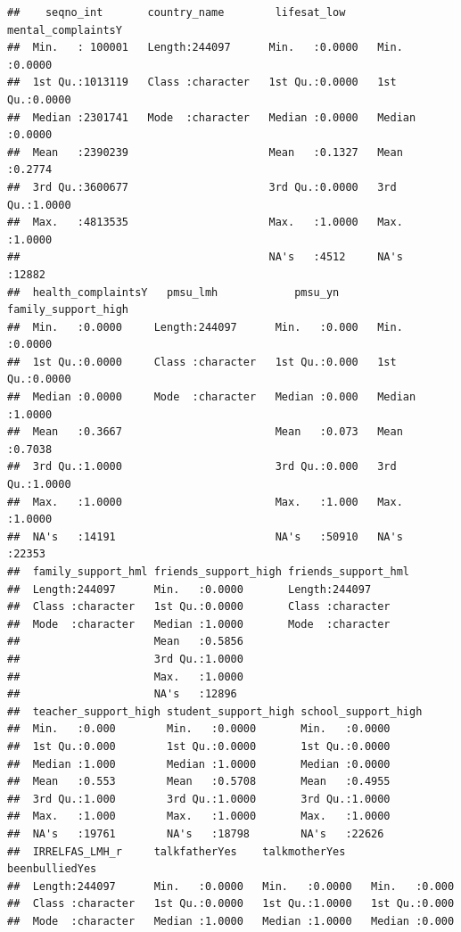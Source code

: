 \documentclass[
]{article}
\begin{document}
\begin{verbatim}
##    seqno_int       country_name        lifesat_low     mental_complaintsY
##  Min.   : 100001   Length:244097      Min.   :0.0000   Min.   :0.0000    
##  1st Qu.:1013119   Class :character   1st Qu.:0.0000   1st Qu.:0.0000    
##  Median :2301741   Mode  :character   Median :0.0000   Median :0.0000    
##  Mean   :2390239                      Mean   :0.1327   Mean   :0.2774    
##  3rd Qu.:3600677                      3rd Qu.:0.0000   3rd Qu.:1.0000    
##  Max.   :4813535                      Max.   :1.0000   Max.   :1.0000    
##                                       NA's   :4512     NA's   :12882     
##  health_complaintsY   pmsu_lmh            pmsu_yn      family_support_high
##  Min.   :0.0000     Length:244097      Min.   :0.000   Min.   :0.0000     
##  1st Qu.:0.0000     Class :character   1st Qu.:0.000   1st Qu.:0.0000     
##  Median :0.0000     Mode  :character   Median :0.000   Median :1.0000     
##  Mean   :0.3667                        Mean   :0.073   Mean   :0.7038     
##  3rd Qu.:1.0000                        3rd Qu.:0.000   3rd Qu.:1.0000     
##  Max.   :1.0000                        Max.   :1.000   Max.   :1.0000     
##  NA's   :14191                         NA's   :50910   NA's   :22353      
##  family_support_hml friends_support_high friends_support_hml
##  Length:244097      Min.   :0.0000       Length:244097      
##  Class :character   1st Qu.:0.0000       Class :character   
##  Mode  :character   Median :1.0000       Mode  :character   
##                     Mean   :0.5856                          
##                     3rd Qu.:1.0000                          
##                     Max.   :1.0000                          
##                     NA's   :12896                           
##  teacher_support_high student_support_high school_support_high
##  Min.   :0.000        Min.   :0.0000       Min.   :0.0000     
##  1st Qu.:0.000        1st Qu.:0.0000       1st Qu.:0.0000     
##  Median :1.000        Median :1.0000       Median :0.0000     
##  Mean   :0.553        Mean   :0.5708       Mean   :0.4955     
##  3rd Qu.:1.000        3rd Qu.:1.0000       3rd Qu.:1.0000     
##  Max.   :1.000        Max.   :1.0000       Max.   :1.0000     
##  NA's   :19761        NA's   :18798        NA's   :22626      
##  IRRELFAS_LMH_r     talkfatherYes    talkmotherYes    beenbulliedYes 
##  Length:244097      Min.   :0.0000   Min.   :0.0000   Min.   :0.000  
##  Class :character   1st Qu.:0.0000   1st Qu.:1.0000   1st Qu.:0.000  
##  Mode  :character   Median :1.0000   Median :1.0000   Median :0.000  

\end{verbatim}
\end{document}
